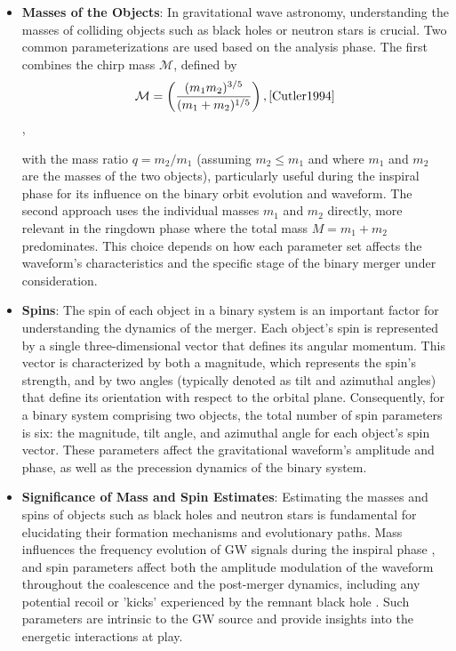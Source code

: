 \documentclass[12pt]{article}
\begin{document}
\begin{itemize}


    \item \textbf{Masses of the Objects}: In gravitational wave astronomy, understanding the masses of colliding objects such as black holes or neutron stars is crucial. Two common parameterizations are used based on the analysis phase. The first combines the chirp mass $\mathcal{M}$, defined by     \[ \mathcal{M} = \left( \frac{(m_1 m_2)^{3/5}}{(m_1 + m_2)^{1/5}} \right), \cite{Cutler1994}\] ,

with the mass ratio $q = m_2 / m_1$ (assuming $m_2 \leq m_1$  and where $m_1$ and $m_2$ are the masses of the two objects), particularly useful during the inspiral phase for its influence on the binary orbit evolution and waveform. The second approach uses the individual masses $m_1$ and $m_2$ directly, more relevant in the ringdown phase where the total mass $M = m_1 + m_2$ predominates. This choice depends on how each parameter set affects the waveform's characteristics and the specific stage of the binary merger under consideration.


    \item \textbf{Spins}: The spin of each object in a binary system is an important factor for understanding the dynamics of the merger. Each object's spin is represented by a single three-dimensional vector that defines its angular momentum. This vector is characterized by both a magnitude, which represents the spin's strength, and by two angles (typically denoted as tilt and azimuthal angles) that define its orientation with respect to the orbital plane. Consequently, for a binary system comprising two objects, the total number of spin parameters is six: the magnitude, tilt angle, and azimuthal angle for each object's spin vector. These parameters affect the gravitational waveform's amplitude and phase, as well as the precession dynamics of the binary system.



    \item \textbf{Significance of Mass and Spin Estimates}: Estimating the masses and spins of objects such as black holes and neutron stars is fundamental for elucidating their formation mechanisms and evolutionary paths. Mass influences the frequency evolution of GW signals during the inspiral phase \cite{Blanchet2014}, and spin parameters affect both the amplitude modulation of the waveform throughout the coalescence \cite{Apostolatos1994} and the post-merger dynamics, including any potential recoil or 'kicks' experienced by the remnant black hole \cite{Campanelli2007, Campanelli2006b}. Such parameters are intrinsic to the GW source and provide insights into the energetic interactions at play.



\end{itemize}
\end{document}
